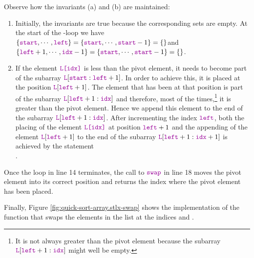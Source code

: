 \begin{enumerate}
      Observe how the invariants (a) and (b) are maintained:
      \begin{enumerate}
      \item Initially, the invariants are true because the corresponding sets are empty.
            At the start of the -loop we have
            \\[0.2cm]
            \hspace*{1.3cm}
            $\{ \mytt{start}, \cdots, \mytt{left} \} = \{ \mytt{start}, \cdots, \mytt{start} - 1\} = \{\}$\quad and
            \\[0.2cm]
            \hspace*{1.3cm}
            $\{ \mytt{left}+1,\cdots,\mytt{idx}-1\} =  \{ \mytt{start},\cdots,\mytt{start}-1\}=\{\}$.
      \item If the element $\mytt{L[idx]}$ is less than the
            pivot element, it needs to become part of the subarray $\mytt{L}[\mytt{start}:\mytt{left}+1]$.  In order to
            achieve this, it is placed at the position $\mytt{L}[\mytt{left}+1]$.  The element that has been at
            that position is part of the subarray $\mytt{L}[\mytt{left}+1:\mytt{idx}]$ and therefore,
            most of the times,\footnote{
              It is not always greater than the pivot element
              because the subarray $\mytt{L}[\mytt{left}+1:\mytt{idx}]$ might well be empty.}
            it is greater than the pivot element.  
            Hence we append this element to the end of the subarray
            $\mytt{L}[\mytt{left}+1:\mytt{idx}]$.  After incrementing the index $\mytt{left}$,
            both the placing of the element $\mytt{L[idx]}$ at position $\mytt{left}+1$ and the appending
            of the element $\mytt{L}[\mytt{left}+1]$ to the end of the subarray
            $\mytt{L}[\mytt{left}+1:\mytt{idx}+1]$ is achieved by the statement
            \\[0.2cm]
            \hspace*{1.3cm}
            .            
      \end{enumerate}
      Once the  loop in line 14 terminates, the call to $\mytt{swap}$ in line 18 moves
      the pivot element into its correct position and returns the index where the pivot element has been
      placed. 
\end{enumerate}
\pagebreak

\noindent
Finally, Figure \ref{fig:quick-sort-array.stlx-swap} shows the
implementation of the function  that swaps the elements in the list  at the indices 
and . 

